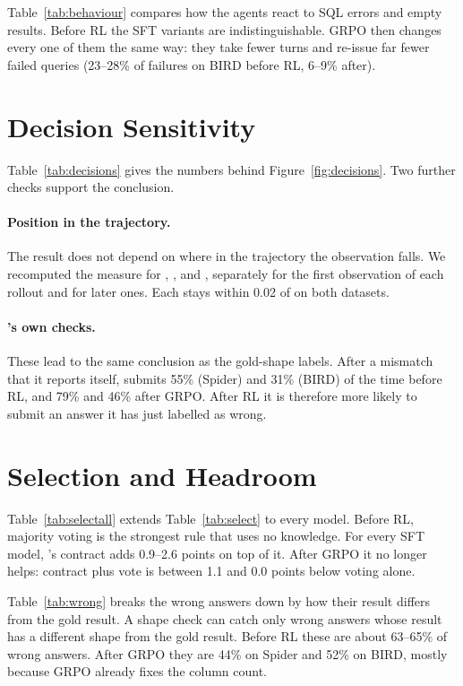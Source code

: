 Table~\ref{tab:behaviour} compares how the agents react to SQL errors and empty results. Before RL the SFT variants are indistinguishable. GRPO then changes every one of them the same way: they take fewer turns and re-issue far fewer failed queries (23--28\% of failures on BIRD before RL, 6--9\% after).



\section{Decision Sensitivity}
\label{app:decisions}

Table~\ref{tab:decisions} gives the numbers behind Figure~\ref{fig:decisions}. Two further checks support the conclusion.

\paragraph{Position in the trajectory.}
The result does not depend on where in the trajectory the observation falls. We recomputed the measure for \armB{}, \armC{}, \armF{} and \armG{}, separately for the first observation of each rollout and for later ones. Each stays within 0.02 of \armA{} on both datasets.

\paragraph{\armG's own checks.}
These lead to the same conclusion as the gold-shape labels. After a mismatch that it reports itself, \armG{} submits 55\% (Spider) and 31\% (BIRD) of the time before RL, and 79\% and 46\% after GRPO. After RL it is therefore more likely to submit an answer it has just labelled as wrong.



\section{Selection and Headroom}
\label{app:headroom}

Table~\ref{tab:selectall} extends Table~\ref{tab:select} to every model. Before RL, majority voting is the strongest rule that uses no knowledge. For every SFT model, \armG's contract adds 0.9--2.6 points on top of it. After GRPO it no longer helps: contract plus vote is between 1.1 and 0.0 points below voting alone.

Table~\ref{tab:wrong} breaks the wrong answers down by how their result differs from the gold result. A shape check can catch only wrong answers whose result has a different shape from the gold result. Before RL these are about 63--65\% of wrong answers. After GRPO they are 44\% on Spider and 52\% on BIRD, mostly because GRPO already fixes the column count.

